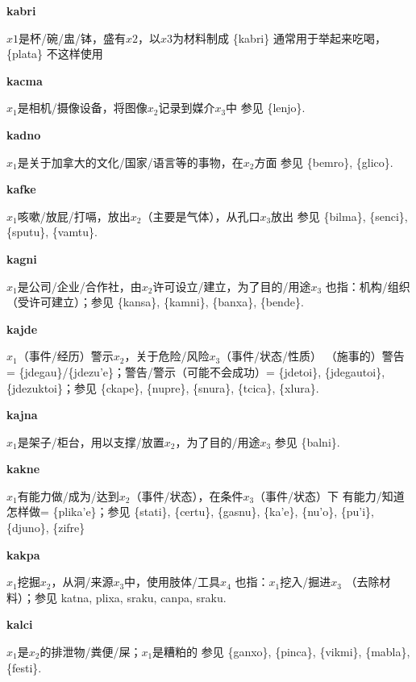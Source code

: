 \documentclass[notitlepage,twocolumn,a4paper,10pt]{book}
\begin{document}
{\sffamily\bfseries kabri} $x1$是杯\slash{}碗\slash{}盅\slash{}钵，盛有$x2$，以$x3$为材料制成 \textemdash{} \{kabri\} 通常用于举起来吃喝，\{plata\} 不这样使用

{\sffamily\bfseries kacma} $x_1$是相机\slash{}摄像设备，将图像$x_2$记录到媒介$x_3$中 \textemdash{} 参见 \{lenjo\}.

{\sffamily\bfseries kadno} $x_1$是关于加拿大的文化\slash{}国家\slash{}语言等的事物，在$x_2$方面 \textemdash{} 参见 \{bemro\}, \{glico\}.

{\sffamily\bfseries kafke} $x_1$咳嗽\slash{}放屁\slash{}打嗝，放出$x_2$（主要是气体），从孔口$x_3$放出 \textemdash{} 参见 \{bilma\}, \{senci\}, \{sputu\}, \{vamtu\}.

{\sffamily\bfseries kagni}\enspace {\ttfamily\bfseries[kag]}  $x_1$是公司\slash{}企业\slash{}合作社，由$x_2$许可设立\slash{}建立，为了目的\slash{}用途$x_3$ \textemdash{} 也指：机构\slash{}组织（受许可建立）；参见 \{kansa\}, \{kamni\}, \{banxa\}, \{bende\}.

{\sffamily\bfseries kajde}\enspace {\ttfamily\bfseries[    jde]}  $x_1$（事件\slash{}经历）警示$x_2$，关于危险\slash{}风险$x_3$（事件\slash{}状态\slash{}性质） \textemdash{} （施事的）警告= \{jdegau\}\slash{}\{jdezu'e\}；警告\slash{}警示（可能不会成功）= \{jdetoi\}, \{jdegautoi\}, \{jdezuktoi\}；参见 \{ckape\}, \{nupre\}, \{snura\}, \{tcica\}, \{xlura\}.

{\sffamily\bfseries kajna} $x_1$是架子\slash{}柜台，用以支撑\slash{}放置$x_2$，为了目的\slash{}用途$x_3$ \textemdash{} 参见 \{balni\}.

{\sffamily\bfseries kakne}\enspace {\ttfamily\bfseries[        ka'e]}  $x_1$有能力做\slash{}成为\slash{}达到$x_2$（事件\slash{}状态），在条件$x_3$（事件\slash{}状态）下 \textemdash{} 有能力\slash{}知道怎样做= \{plika'e\}；参见 \{stati\}, \{certu\}, \{gasnu\}, \{ka'e\}, \{nu'o\}, \{pu'i\}, \{djuno\}, \{zifre\}

{\sffamily\bfseries kakpa} $x_1$挖掘$x_2$，从洞\slash{}来源$x_3$中，使用肢体\slash{}工具$x_4$ \textemdash{} 也指：$x_1$挖入\slash{}掘进$x_3$ （去除材料）；参见 {katna}, {plixa}, {sraku}, {canpa}, {sraku}.

{\sffamily\bfseries kalci} $x_1$是$x_2$的排泄物\slash{}粪便\slash{}屎；$x_1$是糟粕的 \textemdash{} 参见 \{ganxo\}, \{pinca\}, \{vikmi\}, \{mabla\}, \{festi\}.
\end{document}
